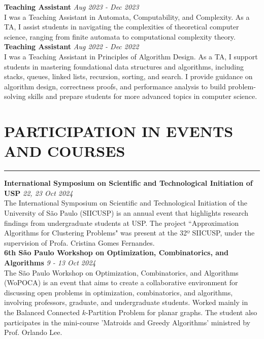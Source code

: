 \documentclass[a4paper,10pt]{article}
\begin{document}
\noindent\textbf{Teaching Assistant}  \hfill  \textit{Aug 2023 - Dec 2023}\\
I was a Teaching Assistant in Automata, Computability, and Complexity. As a TA, I assist students in navigating the complexities of theoretical computer science, ranging from finite automata to computational complexity theory. \\

\noindent\textbf{Teaching Assistant} \hfill  \textit{Aug 2022 - Dec 2022}\\
I was a Teaching Assistant in Principles of Algorithm Design. As a TA, I support students in mastering foundational data structures and algorithms, including stacks, queues, linked lists, recursion, sorting, and search. I provide guidance on algorithm design, correctness proofs, and performance analysis to build problem-solving skills and prepare students for more advanced topics in computer science.\\

\vspace{0.2cm}
\section*{PARTICIPATION IN EVENTS AND COURSES}
\vspace{-1.5em} %
\noindent\rule{\textwidth}{0.4pt} %

\noindent\textbf{International Symposium on Scientific and Technological Initiation of USP} \hfill \textit{22, 23 Oct 2024}\\
The International Symposium on Scientific and Technological Initiation of the University of São Paulo (SIICUSP) is an annual event that highlights research findings from undergraduate students at USP. The project ``Approximation Algorithms for Clustering Problems" was present at the 32º SIICUSP, under the supervision of Profa. Cristina Gomes Fernandes. \\

\noindent\textbf{6th São Paulo Workshop on Optimization, Combinatorics, and Algorithms} \hfill \textit{9 - 13 Oct 2024}\\
The São Paulo Workshop on Optimization, Combinatorics, and Algorithms (WoPOCA) is an event that aims to create a collaborative environment for discussing open problems in optimization, combinatorics, and algorithms, involving professors, graduate, and undergraduate students. Worked mainly in the Balanced Connected \(k\)-Partition Problem for planar graphs. The student also participates in the mini-course 'Matroids and Greedy Algorithms' ministred by Prof. Orlando Lee. \\
\end{document}
